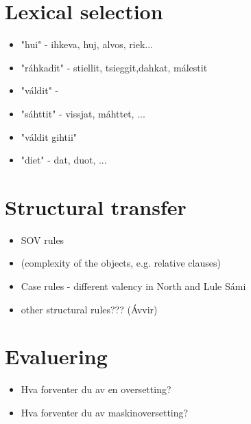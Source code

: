 \documentclass[a4paper,english,12pt]{article}
\begin{document}
\begin{spacing}{1.0}
\section{Lexical selection}
\begin{itemize}
\item "hui" - ihkeva, huj, alvos, riek...
\item "ráhkadit" - stiellit, tsieggit,dahkat, málestit
\item "váldit" - 
\item "sáhttit" - vissjat, máhttet, ...
\item "váldit gihtii" 
\item "diet" - dat, duot, ...
\end{itemize}


\section{Structural transfer} 
\begin{itemize}
  \item SOV rules
  \item (complexity of the objects, e.g. relative clauses)
  \item Case rules - different valency in North and Lule Sámi
  \item other structural rules??? (Ávvir)
\end{itemize}


\section{Evaluering}


\begin{itemize}
\item Hva forventer du av en oversetting?  
\item Hva forventer du av maskinoversetting?
\end{itemize}

\end{spacing}
\end{document}
